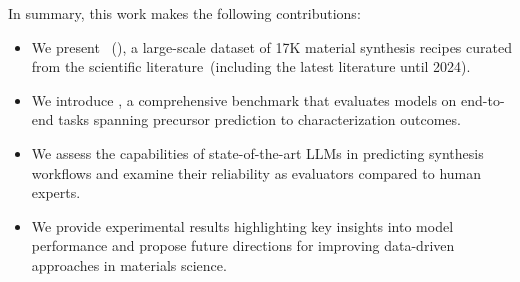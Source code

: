 In summary, this work makes the following contributions:
\begin{itemize}
    \item We present \oursdatalong~(\oursdatashort), a large-scale dataset of 17K material synthesis recipes curated from the scientific literature~(including the latest literature until 2024).
    \item We introduce \oursbench, a comprehensive benchmark that evaluates models on end-to-end tasks spanning precursor prediction to characterization outcomes.
    \item We assess the capabilities of state-of-the-art LLMs in predicting synthesis workflows and examine their reliability as evaluators compared to human experts.
    \item We provide experimental results highlighting key insights into model performance and propose future directions for improving data-driven approaches in materials science.
\end{itemize}


